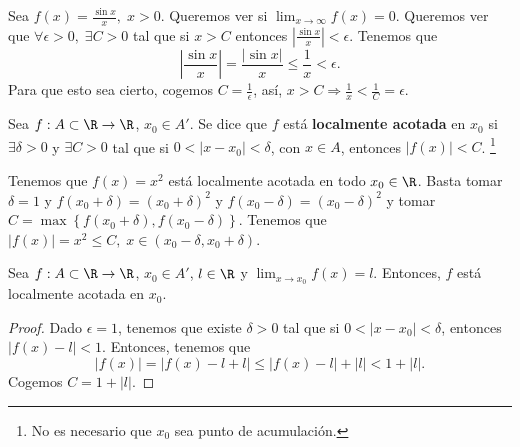 \begin{eg}
\normalfont Sea $\displaystyle f\left(x\right) = \frac{\sin x}{x}, \; x > 0 $. Queremos ver si $\displaystyle \lim_{x \to \infty}f\left(x\right)=0 $. Queremos ver que $\displaystyle \forall\epsilon > 0, \; \exists C>0 $ tal que si $\displaystyle x > C $ entonces $\displaystyle \left|\frac{\sin x}{x}\right| < \epsilon  $. Tenemos que
\[ \left|\frac{\sin x}{x}\right| = \frac{ \left|\sin x\right|}{x} \leq \frac{1}{x} < \epsilon  .\]
Para que esto sea cierto, cogemos $\displaystyle C = \frac{1}{\epsilon } $, así, $\displaystyle x > C \Rightarrow \frac{1}{x} < \frac{1}{C} = \epsilon  $.
\end{eg}

\begin{fdefinition}
\normalfont Sea $\displaystyle f: A \subset \R \to \R $, $\displaystyle x_{0} \in A' $. Se dice que $\displaystyle f $ está \textbf{localmente acotada}  en $\displaystyle x_{0} $ si $\displaystyle \exists\delta>0 $ y $\displaystyle \exists C > 0 $ tal que si $\displaystyle 0 < \left|x -x_{0}\right|<\delta  $, con $\displaystyle x \in A $, entonces $\displaystyle \left|f\left(x\right)\right| < C $. \footnote{No es necesario que $\displaystyle x_{0} $ sea punto de acumulación.} 
\end{fdefinition}

\begin{eg}
	\normalfont Tenemos que $\displaystyle f\left(x\right) = x^{2} $ está localmente acotada en todo $\displaystyle x_{0} \in \R $. Basta tomar $\displaystyle \delta = 1 $ y $\displaystyle f\left(x_{0}+\delta \right) = \left(x_{0}+\delta \right)^{2} $ y $\displaystyle f\left(x_{0}-\delta \right)= \left(x_{0}- \delta \right)^{2} $ y tomar $\displaystyle C = \max \left\{ f\left(x_{0}+\delta \right), f\left(x_{0}-\delta \right)\right\}  $. Tenemos que $\displaystyle \left|f\left(x\right)\right| = x^{2} \leq C, \; x \in \left(x_{0}-\delta, x_{0}+\delta \right) $.
\end{eg}

\begin{ftheorem}[]
\normalfont Sea $\displaystyle f : A\subset\R \to \R $, $\displaystyle x_{0} \in A' $, $\displaystyle l \in \R $ y $\displaystyle \lim_{x \to x_{0}}f\left(x\right) = l $. Entonces, $\displaystyle f $ está localmente acotada en $\displaystyle x_{0} $.
\end{ftheorem}

\begin{proof}
Dado $\displaystyle \epsilon = 1 $, tenemos que existe $\displaystyle \delta > 0 $ tal que si $\displaystyle 0 < \left|x -x_{0}\right| < \delta  $, entonces $\displaystyle \left|f\left(x\right)-l\right|<1 $. Entonces, tenemos que 
\[ \left|f\left(x\right)\right| = \left|f\left(x\right)-l+l\right| \leq \left|f\left(x\right)-l\right| + \left|l\right| < 1 + \left|l\right| .\]
Cogemos $\displaystyle C = 1 + \left|l\right| $.
\end{proof}

